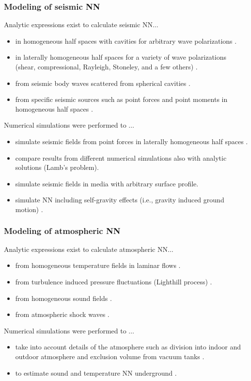 \subsubsection*{Modeling of seismic NN}
\noindent Analytic expressions exist to calculate seismic NN$\ldots$
\begin{itemize}
\item in homogeneous half spaces with cavities for arbitrary wave polarizations \cite{Har2015}.
\item in laterally homogeneous half spaces for a variety of wave polarizations (shear, compressional, Rayleigh, Stoneley, and a few others) \cite{Har2015}.
\item from seismic body waves scattered from spherical cavities \cite{Har2015}.
\item from specific seismic sources such as point forces and point moments in homogeneous half spaces \cite{HaEA2015,Har2016}. 
\end{itemize}
Numerical simulations were performed to $\ldots$
\begin{itemize}
\item simulate seismic fields from point forces in laterally homogeneous half spaces \cite{BeEA2010c}. 
\item compare results from different numerical simulations also with analytic solutions (Lamb's problem).
\item simulate seismic fields in media with arbitrary surface profile.
\item simulate NN including self-gravity effects (i.e., gravity induced ground motion) \cite{VaEA2017}.
\end{itemize}

\subsubsection*{Modeling of atmospheric NN}
\noindent Analytic expressions exist to calculate atmospheric NN$\ldots$
\begin{itemize}
\item from homogeneous temperature fields in laminar flows \cite{Cre2008}.
\item from turbulence induced pressure fluctuations (Lighthill process) \cite{CaAl2009,Har2015}.
\item from homogeneous sound fields \cite{Cre2008,FiEA2018}.
\item from atmospheric shock waves \cite{Cre2008,Har2015}.
\end{itemize}
Numerical simulations were performed to $\ldots$
\begin{itemize}
\item take into account details of the atmosphere such as division into indoor and outdoor atmosphere and exclusion volume from vacuum tanks \cite{FiEA2018}.
\item to estimate sound and temperature NN underground \cite{FiEA2018}.
\end{itemize}

